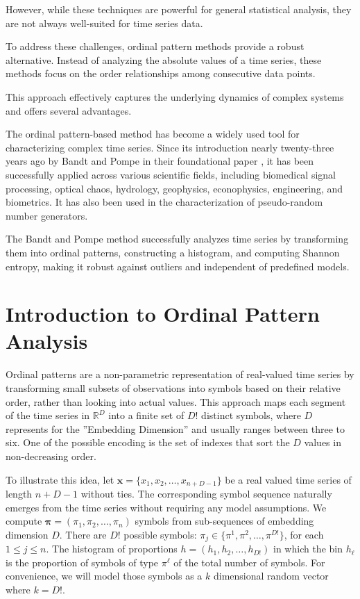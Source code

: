 However, while these techniques are powerful for general statistical analysis, they are not always well-suited for time series data. 

To address these challenges, ordinal pattern methods provide a robust alternative. Instead of analyzing the absolute values of a time series, these methods focus on the order relationships among consecutive data points.

This approach effectively captures the underlying dynamics of complex systems and offers several advantages.

The ordinal pattern-based method has become a widely used tool for characterizing complex time series. Since its introduction nearly twenty-three years ago by Bandt and Pompe in their foundational paper \cite{PhysRevLett.88.174102}, it has been successfully applied across various scientific fields, including biomedical signal processing, optical chaos, hydrology, geophysics, econophysics, engineering, and biometrics. It has also been used in the characterization of pseudo-random number generators.

The Bandt and Pompe method successfully analyzes time series by transforming them into ordinal patterns, constructing a histogram, and computing Shannon entropy, making it robust against outliers and independent of predefined models.


\section{Introduction to Ordinal Pattern Analysis}

Ordinal patterns are a non-parametric representation of real-valued time series by transforming small subsets of observations into symbols based on their relative order, rather than looking into actual values. This approach maps each segment of the time series in $\mathbb{R}^D$ into a finite set of $D!$ distinct symbols, where $D$ represents for the ''Embedding Dimension'' and usually ranges between three to six. 
One of the possible encoding is the set of indexes that sort the $D$ values in non-decreasing order.

To illustrate this idea, let $\bm{x}=\{x_1,x_2, \dots, x_{n+D-1}\}$ 
be a real valued time series of length $n+D-1$ without ties. 
The corresponding symbol sequence naturally emerges from the time series without requiring any model assumptions. We compute
$\bm{{\pi}}=({\pi}_1, {\pi}_2,\dots, {\pi}_n)$ symbols from sub-sequences of embedding dimension $D$. 
There are $D!$ possible symbols: $\pi_j \in \{{\pi}^1, {\pi}^2,\dots, {\pi}^{D!}\}$, for each $1\leq j\leq n$.
The histogram of proportions $h=(h_1,h_2,\dots, h_{D!})$ in which the bin $h_\ell$ 
is the proportion of symbols of type $\pi^\ell$ of the total number of symbols. 
For convenience, we will model those symbols as a $k$ dimensional random vector where $k=D!$.

